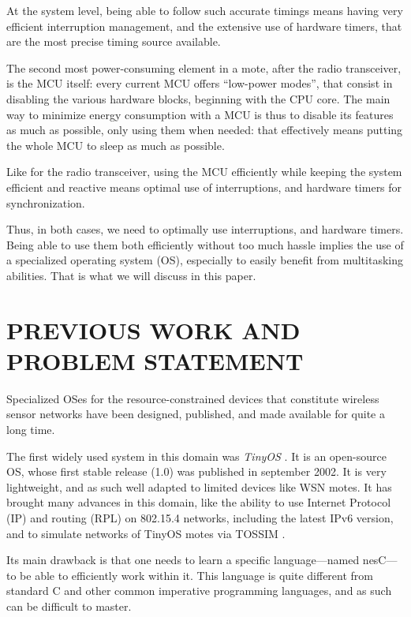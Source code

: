 \documentclass[a4paper,twoside]{article}
\begin{document}
At the system level, being able to follow such accurate timings means having
very efficient interruption management, and the extensive use of hardware
timers, that are the most precise timing source available.

The second most power-consuming element in a mote, after the radio
transceiver, is the MCU itself: every current MCU offers ``low-power modes'',
that consist in disabling the various hardware blocks, beginning with the CPU
core. The main way to minimize energy consumption with a MCU is thus
to disable its features as much as possible, only using them when needed:
that effectively means putting the whole MCU to sleep as much as possible.

Like for the radio transceiver, using the MCU efficiently while keeping
the system efficient and reactive means optimal use of interruptions,
and hardware timers for synchronization.

Thus, in both cases, we need to optimally use interruptions, and hardware
timers. Being able to use them both efficiently without too much hassle
implies the use of a specialized operating system (OS), especially
to easily benefit from multitasking abilities. That is what we will
discuss in this paper.


\section{\uppercase{Previous work and problem statement}}

Specialized OSes for the resource-constrained devices that constitute
wireless sensor networks have been designed, published, and made available
for quite a long time.


The first widely used system in this domain was \emph{TinyOS} \cite{TinyOS}.
It is an open-source OS, whose first stable release (1.0) was published in
september 2002. It is very lightweight, and as such well adapted to limited
devices like WSN motes.  It has brought many advances in this domain, like
the ability to use Internet Protocol (IP) and routing (RPL) on 802.15.4
networks, including the latest IPv6 version, and to simulate networks
of TinyOS motes via TOSSIM \cite{TOSSIM}.

Its main drawback is that one needs to learn a specific language---named
nesC---to be able to efficiently work within it. This language is quite
different from standard C and other common imperative programming languages,
and as such can be difficult to master.
\end{document}
